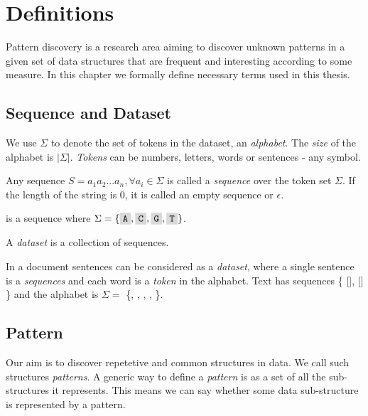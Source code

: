 \chapter{Definitions}
\label{c:definitions}

Pattern discovery is a research area aiming to discover unknown patterns in a given set of data structures that are frequent and interesting according to some measure. In this chapter we formally define necessary terms used in this thesis.

\section{Sequence and Dataset}

We use $\Sigma$ to denote the set of tokens in the dataset, an \emph{alphabet}. 
The \emph{size} of the alphabet is $|\Sigma|$. \emph{Tokens} can be numbers, 
letters, words or sentences - any symbol.

Any sequence $S=a_1 a_2 ... a_n, \forall a_i \in \Sigma$ is called a \emph{sequence} 
over the token set $\Sigma$. If the length of the
string is $0$, it is called an empty sequence or $\epsilon$.

\begin{exmp}
 is a sequence where $\Sigma = \{\R{A}, \R{C}, \R{G}, \R{T}\}$.
\end{exmp}

A \emph{dataset} is a collection of sequences.

\begin{exmp}
In a document sentences can be considered as a \emph{dataset}, where a single sentence is a \emph{sequences} and each word is a \emph{token} in the alphabet. Text  has sequences \{ [], [] \} and the alphabet is $\Sigma =$ \{, , , , \}.	
\end{exmp}

\section{Pattern}

Our aim is to discover repetetive and common structures in data. We call such structures \emph{patterns}. A generic way to define a \emph{pattern} is as a set of all the sub-structures it represents. This means we can say whether some data sub-structure is represented by a pattern.

